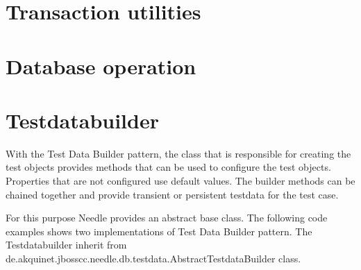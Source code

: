 \section{Transaction utilities}

\section{Database operation}


\section{Testdatabuilder}

With the Test Data Builder pattern, the class that is responsible for creating the test objects provides methods that can be used to configure the test objects. Properties that are not configured use default values. The builder methods can be chained together and provide transient or persistent testdata for the test case.

For this purpose Needle provides an abstract base class. The following code examples shows two implementations of Test Data Builder pattern. The Testdatabuilder inherit from 
de.akquinet.jbosscc.needle.db.testdata.\-AbstractTestdataBuilder class. 


